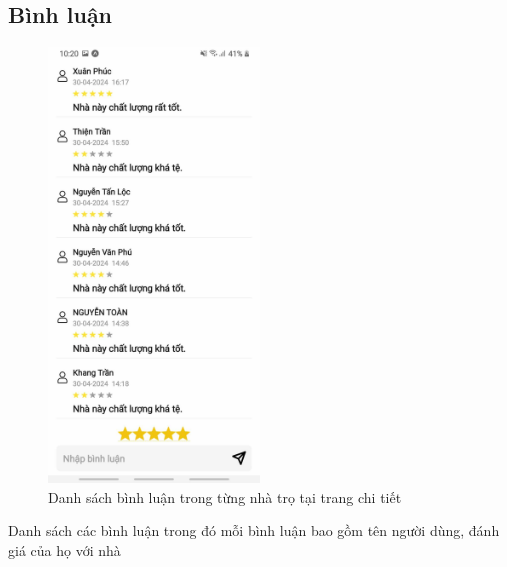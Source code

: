 \subsection{Bình luận}
\begin{figure}[H]
    \centering
    \includegraphics[width=0.5\textwidth]{Images/app_image/app_11.jpg}
    \caption{Danh sách bình luận trong từng nhà trọ tại trang chi tiết}
\end{figure}
Danh sách các bình luận trong đó mỗi bình luận bao gồm tên người dùng, đánh giá của họ với nhà
